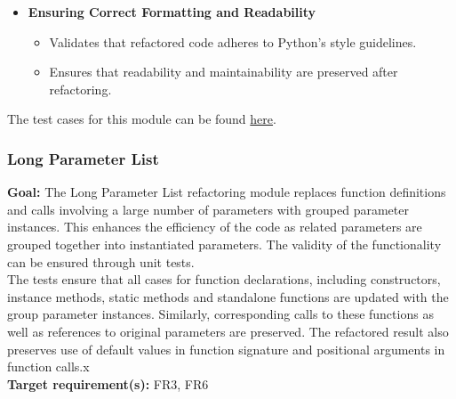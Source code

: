 \documentclass[12pt, titlepage]{article}
\begin{document}
\begin{itemize}
    \item \textbf{Ensuring Correct Formatting and Readability}
      \begin{itemize}
        \item Validates that refactored code adheres to Python’s
          style guidelines.
        \item Ensures that readability and maintainability are
          preserved after refactoring.
      \end{itemize}
  \end{itemize}

  \noindent The test cases for this module can be found
  \href{https://github.com/ssm-lab/capstone--source-code-optimizer/blob/main/tests/refactorers/test_repeated_calls.py}{here}.

  \subsubsection{Long Parameter List}

  \textbf{Goal:} The Long Parameter List refactoring module replaces
  function definitions and calls involving a large number of
  parameters with grouped parameter instances. This enhances the
  efficiency of the code as related parameters are grouped together
  into instantiated parameters. The validity of the functionality can
  be ensured through unit tests.\\

  \noindent The tests ensure that all cases for function
  declarations, including constructors, instance methods, static
  methods and standalone functions are updated with the group
  parameter instances. Similarly, corresponding calls to these
  functions as well as references to original parameters are
  preserved. The refactored result also preserves use of default
  values in function signature and positional arguments in function calls.x\\

  \noindent \textbf{Target requirement(s):} FR3, FR6~\cite{SRS} \\
\end{document}
